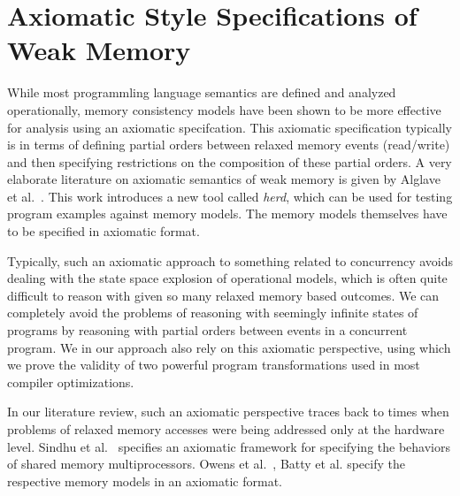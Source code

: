 \section{Axiomatic Style Specifications of Weak Memory}

While most programmling language semantics are defined and analyzed operationally, memory consistency models have been shown to be more effective for analysis using an axiomatic specifcation.
This axiomatic specification typically is in terms of defining partial orders between relaxed memory events (read/write) and then specifying restrictions on the composition of these partial orders. 
A very elaborate literature on axiomatic semantics of weak memory is given by Alglave et al.~\cite{Alglave}. 
This work introduces a new tool called \textit{herd}, which can be used for testing program examples against memory models. The memory models themselves have to be specified in axiomatic format. 

Typically, such an axiomatic approach to something related to concurrency avoids dealing with the state space explosion of operational models, which is often quite difficult to reason with given so many relaxed memory based outcomes. 
We can completely avoid the problems of reasoning with seemingly infinite states of programs by reasoning with partial orders between events in a concurrent program.
We in our approach also rely on this axiomatic perspective, using which we prove the validity of two powerful program transformations used in most compiler optimizations. 

In our literature review, such an axiomatic perspective traces back to times when problems of relaxed memory accesses were being addressed only at the hardware level. 
Sindhu et al.~\cite{Sindhu} specifies an axiomatic framework for specifying the behaviors of shared memory multiprocessors. 
Owens et al.~\cite{OwensS}, Batty et al.\cite{BattyM} specify the respective memory models in an axiomatic format. 



